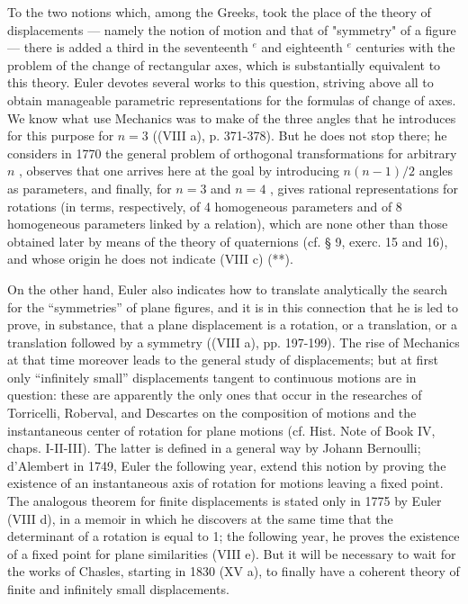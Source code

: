 To the two notions which, among the Greeks, took the place of the theory of displacements --- namely the notion of motion and that of "symmetry" of a figure --- there is added a third in the seventeenth \(^{e}\) and eighteenth \(^{e}\) centuries with the problem of the change of rectangular axes, which is substantially equivalent to this theory. Euler devotes several works to this question, striving above all to obtain manageable parametric representations for the formulas of change of axes. We know what use Mechanics was to make of the three angles that he introduces for this purpose for \(n = 3\) ((VIII a), p. 371-378). But he does not stop there; he considers in 1770 the general problem of orthogonal transformations for arbitrary \(n\) , observes that one arrives here at the goal by introducing \(n(n - 1)/2\) angles as parameters, and finally, for \(n = 3\) and \(n = 4\) , gives rational representations for rotations (in terms, respectively, of 4 homogeneous parameters and of 8 homogeneous parameters linked by a relation), which are none other than those obtained later by means of the theory of quaternions (cf. § 9, exerc. 15 and 16), and whose origin he does not indicate (VIII c) (**).

On the other hand, Euler also indicates how to translate analytically the search for the “symmetries” of plane figures, and it is in this connection that he is led to prove, in substance, that a plane displacement is a rotation, or a translation, or a translation followed by a symmetry ((VIII a), pp. 197-199). The rise of Mechanics at that time moreover leads to the general study of displacements; but at first only “infinitely small” displacements tangent to continuous motions are in question: these are apparently the only ones that occur in the researches of Torricelli, Roberval, and Descartes on the composition of motions and the instantaneous center of rotation for plane motions (cf. Hist. Note of Book IV, chaps. I-II-III). The latter is defined in a general way by Johann Bernoulli; d'Alembert in 1749, Euler the following year, extend this notion by proving the existence of an instantaneous axis of rotation for motions leaving a fixed point. The analogous theorem for finite displacements is stated only in 1775 by Euler (VIII d), in a memoir in which he discovers at the same time that the determinant of a rotation is equal to 1; the following year, he proves the existence of a fixed point for plane similarities (VIII e). But it will be necessary to wait for the works of Chasles, starting in 1830 (XV a), to finally have a coherent theory of finite and infinitely small displacements.
